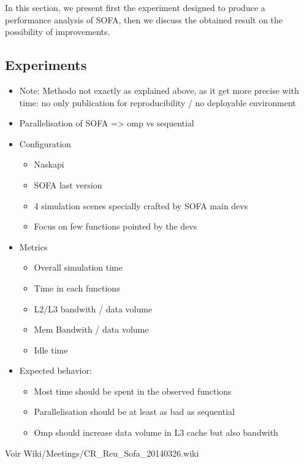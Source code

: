 In this section, we present first the experiment designed to produce a
performance analysis of \gls{SOFA}, then we discuss the obtained result on the
possibility of improvements.

\subsection{Experiments}

\begin{itemize}
    \item  Note: Methodo not exactly as explained above, as it get more
        precise with time: no only publication for reproducibility / no
        deployable environment
    \item Parallelisation of SOFA => omp vs sequential
    \item Configuration
        \begin{itemize}
            \item Naskapi
            \item SOFA last version
            \item 4 simulation scenes specially crafted by SOFA main devs
            \item Focus on few functions pointed by the devs
        \end{itemize}
    \item Metrics
        \begin{itemize}
            \item Overall simulation time
            \item Time in each functions
            \item L2/L3 bandwith / data volume
            \item Mem Bandwith / data volume
            \item Idle time
        \end{itemize}
    \item Expected behavior:
        \begin{itemize}
            \item Most time should be spent in the observed functions
            \item Parallelisation should be at least as bad as sequential
            \item Omp should increase data volume in L3 cache but also
                bandwith
        \end{itemize}
\end{itemize}

Voir Wiki/Meetings/CR\_Reu\_Sofa\_20140326.wiki

